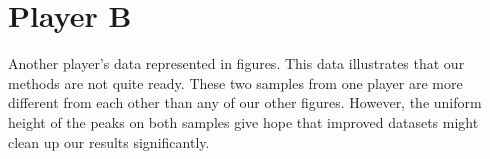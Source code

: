 \documentclass[12pt]{article}
\begin{document}
\newpage


\section*{Player B}

Another player's data represented in figures. This data illustrates that our methods are not
quite ready. These two samples from one player are more different from each other than any
of our other figures. However, the uniform height of the peaks on both samples give hope
that improved datasets might clean up our results significantly.

\begin{figure}[ht!]
\end{figure}
\end{document}
